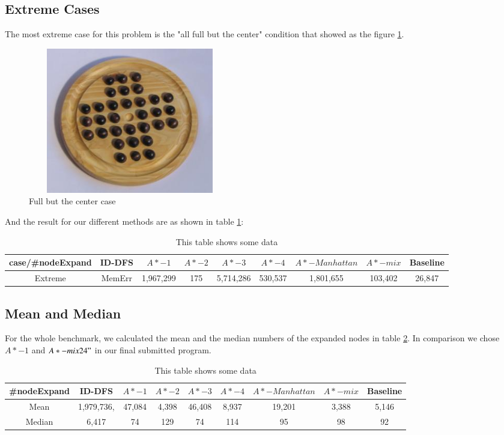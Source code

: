 \documentclass[11pt, letter]{article}
\begin{document}
\subsection{Extreme Cases}
The most extreme case for this problem is the "all full but the center" condition that showed as the figure \ref{fig_full}. \\
\begin{figure} [h!]
\centering
\includegraphics[height=2.5in, width=3.5in]{figs/PegSolitaire_full.jpg}
\caption{Full but the center case}
\label{fig_full}
\end{figure}
And the result for our different methods are as shown in table \ref{tab_resfull}:
\begin{table}[h!]
  \centering
  \begin{tabular}{ | c | c |  c | c | c | c |  c | c| c|}
\hline
case/\#nodeExpand & ID-DFS & $A*- 1$ & $A*-2$ & $A*-3$ & $A*-4$ & $A*-Manhattan$ & $A*-mix$ & Baseline \\ \hline
Extreme & MemErr & 1,967,299 & 175 & 5,714,286 & 530,537 & 1,801,655 & 103,402 & 26,847 \\ \hline
  \end{tabular}
  \caption{This table shows some data}
  \label{tab_resfull}
\end{table}
\subsection{Mean and Median}
For the whole benchmark, we calculated the mean and the median numbers of the expanded nodes in table \ref{tbl_mean}. In comparison we chose $A*-1$ and $A*-mix24"$ in our final submitted program. \\
\begin{table}[h!]
  \centering
  \begin{tabular}{ | c | c |  c | c | c | c |  c | c| c|}
\hline
\#nodeExpand & ID-DFS & $A*- 1$ & $A*-2$ & $A*-3$ & $A*-4$ & $A*-Manhattan$ & $A*-mix$ & Baseline \\ \hline
Mean & 1,979,736, & 47,084 & 4,398 & 46,408 & 8,937 & 19,201 & 3,388 & 5,146 \\ \hline
Median & 6,417 & 74 & 129 & 74 & 114 & 95 & 98 & 92 \\ \hline
  \end{tabular}
  \caption{This table shows some data}
  \label{tbl_mean}
\end{table}
\end{document}
